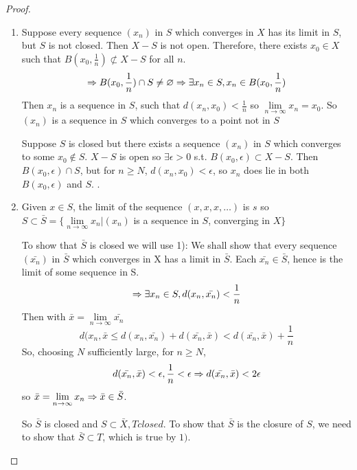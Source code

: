 \begin{proof}
\begin{enumerate}
\item {} Suppose every sequence $(x_n)$ in $S$ which converges in $X$ has its limit in $S$, but $S$ is not closed. Then $X-S$ is not open. Therefore, there exists $x_0\in X$ such that $B(x_0,\frac{1}{n}) \not\subset X-S$ for all $n$.
\[ \Rightarrow B(x_0,\frac{1}{n}) \cap S \neq \varnothing \Rightarrow \exists x_n\in S, x_n \in B(x_0,\frac{1}{n}) \]
Then $x_n$ is a sequence in $S$, such that $d(x_n,x_0)<\frac{1}{n}$ so $\lim\limits_{n\to\infty} x_n = x_0$. So $(x_n)$ is a sequence in $S$ which converges to a point not in $S$ 
\par{} Suppose $S$ is closed but there exists a sequence $(x_n)$ in $S$ which converges to some $x_0\notin S$. $X-S$ is open so $\exists \epsilon>0$ s.t. $B(x_0,\epsilon)\subset X-S$. Then $B(x_0,\epsilon) \cap S$, but for $n \geq N$, $d(x_n,x_0)<\epsilon$, so $x_n$ does lie in both $B(x_0,\epsilon)$ and $S$. .
\item \par Given $x \in S$, the limit of the sequence $(x,x,x,\ldots)$ is $s$ so $S\subset\bar{S}=\{\lim\limits_{n\to\infty} x_n | (x_n)$ is a sequence in $S$, converging in $X\}$ \par 
To show that $\bar{S}$ is closed we will use 1): We shall show that every sequence $(\bar{x_n})$ in $\bar{S}$ which converges in X has a limit in $\bar{S}$. Each $\bar{x_n}\in\bar{S}$, hence is the limit of some sequence in S.
\[ \Rightarrow \exists x_n \in S, d(x_n,\bar{x_n})<\frac{1}{n} \]
Then with $\bar{x} = \lim\limits_{n\to\infty} \bar{x_n}$
\[ d(x_n,\bar{x} \leq d(x_n,\bar{x_n}) + d(\bar{x_n},\bar{x}) < d(\bar{x_n},\bar{x}) + \frac{1}{n} \]
So, choosing $N$ sufficiently large, for $n\geq N$, 
\[d(\bar{x_n},\bar{x})<\epsilon,\frac{1}{n}<\epsilon \Rightarrow d(\bar{x_n},\bar{x}) < 2\epsilon \]
so $\bar{x}=\lim\limits_{n\to\infty} x_n \Rightarrow \bar{x}\in\bar{S}$. \par 
So $\bar{S}$ is closed and $S\subset \bar{X}, T closed$. To show that $\bar{S}$ is the closure of $S$, we need to show that $\bar{S}\subset T$, which is true by $1)$.
\end{enumerate}
\end{proof}
